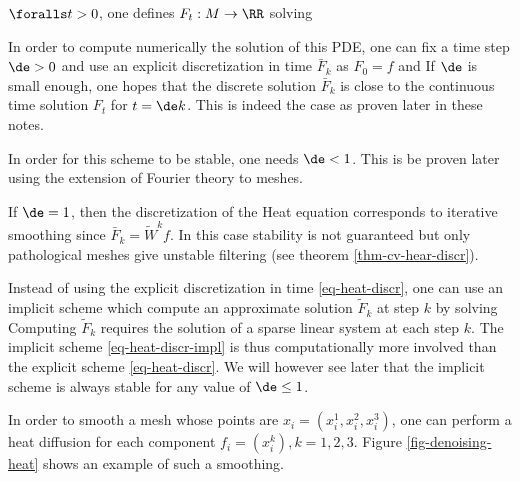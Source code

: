 \begin{defn}  $\foralls t>0$, one defines $F_t : M \rightarrow \RR$ solving
\end{defn}

In order to compute numerically the solution of this PDE, one can fix a time step $\de > 0$ and use an explicit discretization in time $\bar F_k$ as $F_0=f$ and
If $\de$ is small enough, one hopes that the discrete solution $\bar F_k$ is close to the continuous time solution $F_t$ for $t=\de k$. This is indeed the case as proven later in these notes.

\begin{rem} In order for this scheme to be stable, one needs $\de < 1$. This is be proven later using the extension of Fourier theory to meshes.
\end{rem}

\begin{rem} If $\de=1$, then the discretization of the Heat equation corresponds to iterative smoothing since $\bar F_k = \tilde W^k f$. In this case stability is not guaranteed but only pathological meshes give unstable filtering (see theorem \ref{thm-cv-hear-discr}).
\end{rem}

Instead of using the explicit discretization in time \eqref{eq-heat-discr}, one can use an implicit scheme which compute an approximate solution $\tilde F_k$ at step $k$ by solving
Computing $\tilde F_k$ requires the solution of a sparse linear system at each step $k$. The implicit scheme \eqref{eq-heat-discr-impl} is thus computationally more involved than the explicit scheme \eqref{eq-heat-discr}. We will however see later that the implicit scheme is always stable for any value of $\de \leq 1$.

\begin{exmp} In order to smooth a mesh whose points are $x_i = (x_i^1,x_i^2,x_i^3)$, one can perform a heat diffusion for each component $f_i = (x_i^k), k=1,2,3$. Figure \ref{fig-denoising-heat} shows an example of such a smoothing.
\end{exmp}

